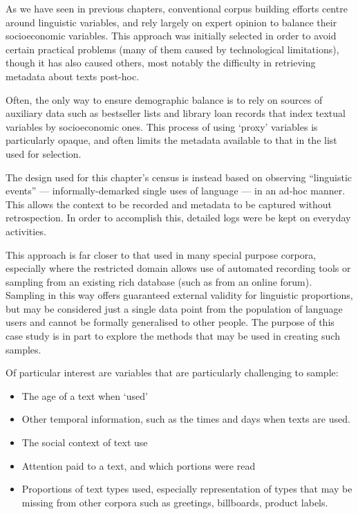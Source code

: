 As we have seen in previous chapters, conventional corpus building efforts centre around linguistic variables, and rely largely on expert opinion to balance their socioeconomic variables.  This approach was initially selected in order to avoid certain practical problems (many of them caused by technological limitations), though it has also caused others, most notably the difficulty in retrieving metadata about texts post-hoc.

Often, the only way to ensure demographic balance is to rely on sources of auxiliary data such as bestseller lists and library loan records that index textual variables by socioeconomic ones.  This process of using `proxy' variables is particularly opaque, and often limits the metadata available to that in the list used for selection.

The design used for this chapter's census is instead based on observing ``linguistic events'' --- informally-demarked single uses of language --- in an ad-hoc manner.  This allows the context to be recorded and metadata to be captured without retrospection.  In order to accomplish this, detailed logs were be kept on everyday activities.

This approach is far closer to that used in many special purpose corpora, especially where the restricted domain allows use of automated recording tools or sampling from an existing rich database (such as from an online forum).  Sampling in this way offers guaranteed external validity for linguistic proportions, but may be considered just a single data point from the population of language users and cannot be formally generalised to other people.  The purpose of this case study is in part to explore the methods that may be used in creating such samples.

Of particular interest are variables that are particularly challenging to sample:

\begin{itemize}
    \item The age of a text when `used'
    \item Other temporal information, such as the times and days when texts are used.
    \item The social context of text use
    \item Attention paid to a text, and which portions were read
    \item Proportions of text types used, especially representation of types that may be missing from other corpora such as greetings, billboards, product labels.
\end{itemize}


